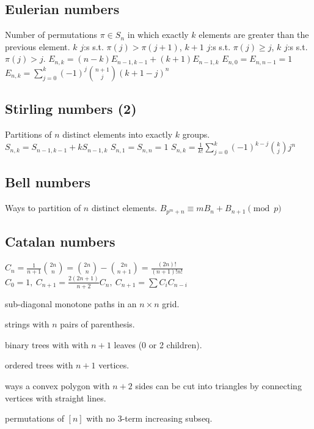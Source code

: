 	\subsection{Eulerian numbers}
		Number of permutations $\pi \in S_n$ in which exactly $k$ elements are greater than the previous element. $k$ $j$:s s.t. $\pi(j)>\pi(j+1)$, $k+1$ $j$:s s.t. $\pi(j)\geq j$, $k$ $j$:s s.t. $\pi(j)>j$.
		$E_{n,k} = (n-k)E_{n-1,k-1} + (k+1)E_{n-1,k}$
		$E_{n,0} = E_{n,n-1} = 1$
		$E_{n,k} = \sum_{j=0}^k(-1)^j\binom{n+1}{j}(k+1-j)^n$

	\subsection{Stirling numbers (2)}
		Partitions of $n$ distinct elements into exactly $k$ groups.
		$S_{n,k} = S_{n-1,k-1} + k S_{n-1,k}$
		$S_{n,1} = S_{n,n} = 1$
		$S_{n,k} = \frac{1}{k!}\sum_{j=0}^k (-1)^{k-j}\binom{k}{j}j^n$

	\subsection{Bell numbers}
		Ways to partition of $n$ distinct elements. 
		$B_{p^m+n}\equiv mB_{n}+B_{n+1} \pmod{p}$


	\subsection{Catalan numbers}
		$C_n=\frac{1}{n+1}\binom{2n}{n}= \binom{2n}{n}-\binom{2n}{n+1} = \frac{(2n)!}{(n+1)!n!}$
		$ C_0=1,\ C_{n+1} = \frac{2(2n+1)}{n+2}C_n,\ C_{n+1}=\sum C_iC_{n-i}$
		\begin{itemize*}[noitemsep]
			\item sub-diagonal monotone paths in an $n\times n$ grid.
			\item strings with $n$ pairs of parenthesis.
			\item binary trees with with $n+1$ leaves (0 or 2 children).
			\item ordered trees with $n+1$ vertices.
			\item ways a convex polygon with $n+2$ sides can be cut into triangles by connecting vertices with straight lines.
			\item permutations of $[n]$ with no 3-term increasing subseq.
		\end{itemize*}
